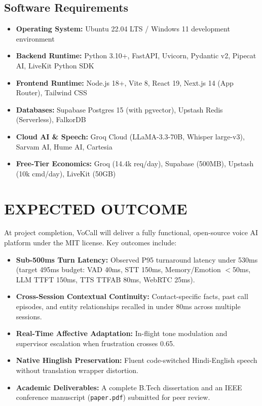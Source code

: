 \documentclass[12pt,a4paper]{article}
\begin{document}
\subsection{Software Requirements}
\begin{itemize}
    \item \textbf{Operating System:} Ubuntu 22.04 LTS / Windows 11 development environment
    \item \textbf{Backend Runtime:} Python 3.10+, FastAPI, Uvicorn, Pydantic v2, Pipecat AI, LiveKit Python SDK
    \item \textbf{Frontend Runtime:} Node.js 18+, Vite 8, React 19, Next.js 14 (App Router), Tailwind CSS
    \item \textbf{Databases:} Supabase Postgres 15 (with pgvector), Upstash Redis (Serverless), FalkorDB
    \item \textbf{Cloud AI \& Speech:} Groq Cloud (LLaMA-3.3-70B, Whisper large-v3), Sarvam AI, Hume AI, Cartesia
    \item \textbf{Free-Tier Economics:} Groq (14.4k req/day), Supabase (500MB), Upstash (10k cmd/day), LiveKit (50GB)
\end{itemize}

\section{EXPECTED OUTCOME}
At project completion, VoCall will deliver a fully functional, open-source voice AI platform under the MIT license. Key outcomes include:
\begin{itemize}
    \item \textbf{Sub-500ms Turn Latency:} Observed P95 turnaround latency under 530ms (target 495ms budget: VAD 40ms, STT 150ms, Memory/Emotion $<$50ms, LLM TTFT 150ms, TTS TTFAB 80ms, WebRTC 25ms).
    \item \textbf{Cross-Session Contextual Continuity:} Contact-specific facts, past call episodes, and entity relationships recalled in under 80ms across multiple sessions.
    \item \textbf{Real-Time Affective Adaptation:} In-flight tone modulation and supervisor escalation when frustration crosses 0.65.
    \item \textbf{Native Hinglish Preservation:} Fluent code-switched Hindi-English speech without translation wrapper distortion.
    \item \textbf{Academic Deliverables:} A complete B.Tech dissertation and an IEEE conference manuscript (\texttt{paper.pdf}) submitted for peer review.
\end{itemize}
\end{document}
